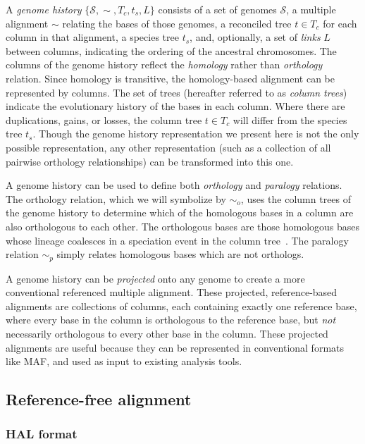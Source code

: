 \documentclass[fleqn,10pt]{wlscirep}
\begin{document}
A \emph{genome history} $\{\mathcal{S}, \sim, T_c, t_s, L\}$ consists of a set of genomes $\mathcal{S}$, a multiple alignment $\sim$ relating the bases of those genomes, a reconciled tree $t \in T_c$ for each column in that alignment, a species tree $t_s$, and, optionally, a set of \emph{links} $L$ between columns, indicating the ordering of the ancestral chromosomes.
The columns of the genome history reflect the \emph{homology} rather than \emph{orthology} relation.
Since homology is transitive, the homology-based alignment can be represented by columns.
The set of trees (hereafter referred to as \emph{column trees}) indicate the evolutionary history of the bases in each column.
Where there are duplications, gains, or losses, the column tree $t \in T_c$ will differ from the species tree $t_s$.
Though the genome history representation we present here is not the only possible representation, any other representation (such as a collection of all pairwise orthology relationships) can be transformed into this one.

A genome history can be used to define both \emph{orthology} and \emph{paralogy} relations.
The orthology relation, which we will symbolize by $\sim_o$, uses the column trees of the genome history to determine which of the homologous bases in a column are also orthologous to each other.
The orthologous bases are those homologous bases whose lineage coalesces in a speciation event in the column tree~\cite{Koonin2005}.
The paralogy relation $\sim_p$ simply relates homologous bases which are not orthologs.

A genome history can be \emph{projected} onto any genome to create a more conventional referenced multiple alignment.
These projected, reference-based alignments are collections of columns, each containing exactly one reference base, where every base in the column is orthologous to the reference base, but \emph{not} necessarily orthologous to every other base in the column.
These projected alignments are useful because they can be represented in conventional formats like MAF, and used as input to existing analysis tools.

\subsection{Reference-free alignment}

\subsubsection{HAL format}
\end{document}
